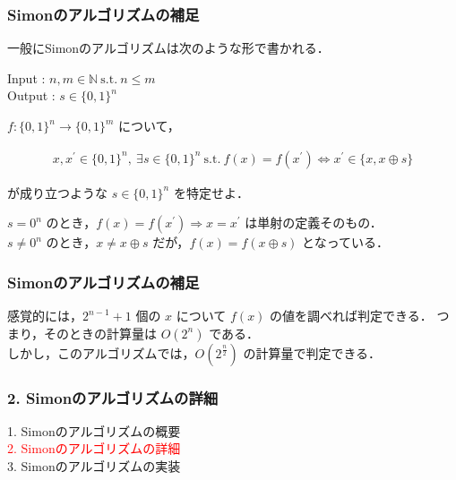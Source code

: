 \documentclass[dvipdfmx,12pt]{beamer}%
\begin{document}
\begin{frame}

\frametitle{Simonのアルゴリズムの補足}

一般にSimonのアルゴリズムは次のような形で書かれる．

\vspace{10pt}

Input : $n, m \in \mathbb{N} \ \mathrm{s.t.} \ n \leq m$ \\
Output : $ s \in \{ 0, 1 \}^n $ \\

\vspace{10pt}

$ f : \{ 0, 1 \}^n \rightarrow \{ 0, 1 \}^m $ について，\vspace{-15pt}

\begin{align*}
    x , x^{\prime} \in \{0, 1\}^n, \ \exists s \in \{ 0, 1 \}^n \ \mathrm{s.t.} \ f(x) = f(x^{\prime}) \Leftrightarrow x^{\prime} \in \{ x, x \oplus s \}
\end{align*}

が成り立つような $ s \in \{ 0, 1 \}^n $ を特定せよ．

\vspace{10pt}

$ s = 0^n $ のとき，$ f(x) = f(x^{\prime}) \Rightarrow x =  x^{\prime} $ は単射の定義そのもの． \\
$ s \neq 0^n $ のとき，$ x \neq x \oplus s $ だが，$ f(x) = f(x \oplus s) $ となっている．              

\end{frame}


\begin{frame}

\frametitle{Simonのアルゴリズムの補足}
    
感覚的には，$ 2^{n - 1} + 1 $ 個の $x$ について $f(x)$ の値を調べれば判定できる．
つまり，そのときの計算量は $ O(2^n) $ である． \\
しかし，このアルゴリズムでは，$ O(2^{\frac{n}{2}}) $ の計算量で判定できる．
    
\vspace{10pt}
                
    
\end{frame}


\begin{frame}

\frametitle{2. Simonのアルゴリズムの詳細}
      
1. Simonのアルゴリズムの概要 \\
\textcolor{red}{2. Simonのアルゴリズムの詳細} \\
3. Simonのアルゴリズムの実装 \\
          
\end{frame}
\end{document}

